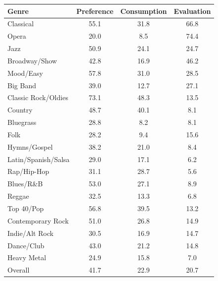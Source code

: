 \begin{tabular}{lccc}
\toprule
Genre & Preference & Consumption & Evaluation \\
\midrule
Classical & 55.1 & 31.8 & 66.8 \\
Opera & 20.0 & 8.5 & 74.4 \\
Jazz & 50.9 & 24.1 & 24.7 \\
Broadway/Show & 42.8 & 16.9 & 46.2 \\
Mood/Easy & 57.8 & 31.0 & 28.5 \\
Big Band & 39.0 & 12.7 & 27.1 \\
Classic Rock/Oldies & 73.1 & 48.3 & 13.5 \\
Country & 48.7 & 40.1 & 8.1 \\
Bluegrass & 28.8 & 8.2 & 8.1 \\
Folk & 28.2 & 9.4 & 15.6 \\
Hymns/Gospel & 38.2 & 21.0 & 8.4 \\
Latin/Spanish/Salsa & 29.0 & 17.1 & 6.2 \\
Rap/Hip-Hop & 31.1 & 28.7 & 5.6 \\
Blues/R\&B & 53.0 & 27.1 & 8.9 \\
Reggae & 32.5 & 13.3 & 6.8 \\
Top 40/Pop & 56.8 & 39.5 & 13.2 \\
Contemporary Rock & 51.0 & 26.8 & 14.9 \\
Indie/Alt Rock & 30.5 & 16.9 & 14.7 \\
Dance/Club & 43.0 & 21.2 & 14.8 \\
Heavy Metal & 24.9 & 15.8 & 7.0 \\
\midrule
Overall & 41.7 & 22.9 & 20.7 \\
\bottomrule
\end{tabular}
